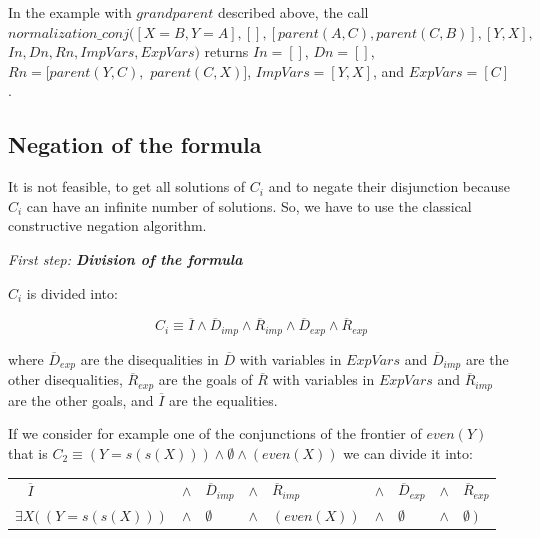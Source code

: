 \documentclass{tlp}
\begin{document}
\begin{itemize}
{In the example with $grandparent$ described above, the call \\
$normalization\_conj([X=B,Y=A], [], [parent(A,C),parent(C,B)], [Y,X],$ $ In, Dn,
Rn, ImpVars, ExpVars)$ 
returns $In=[]$, $Dn=[]$, $Rn=[parent(Y,C),$ $parent(C,X)]$, $ImpVars=[Y,X]$, and
$ExpVars=[C]$.
}
 \end{itemize}  
 


\subsection{Negation of the formula}
\label{negation}

It is not feasible, to get all solutions of $C_i$ and to negate their
disjunction because $C_i$ can have an infinite number of solutions. So,
we have to use the classical constructive negation algorithm.

\medskip

\noindent
{\em First step: {\bf Division of the formula}}

\noindent
$C_i$ is divided into: 

\[~C_i \equiv \overline{I} \wedge
        \overline{D}_{imp} \wedge \overline{R}_{imp} \wedge
        \overline{D}_{exp} \wedge \overline{R}_{exp} \]

\noindent
where $\overline{D}_{exp}$ are the disequalities in $\overline{D}$
with variables in $ExpVars$ and $\overline{D}_{imp}$ are the other
disequalities, $\overline{R}_{exp}$ are the goals of $\overline{R}$
with variables in $ExpVars$ and $\overline{R}_{imp}$ are the other
goals, and $\overline{I}$ are the equalities.

If we consider for example one of the conjunctions of the frontier of
$even(Y)$ that is $C_2 \equiv ( Y=s(s(X)) ) \wedge \emptyset \wedge ( even(X)
)$ we can divide it into:

\begin{center}
\begin{tabular}{lllllllll}
$~~~~\overline{I}$ & $\wedge$ & 
        $\overline{D}_{imp}$ & $\wedge$ & $\overline{R}_{imp}$ & $
        \wedge$ &
        $\overline{D}_{exp}$ & $ \wedge$ & $ \overline{R}_{exp}$ \\
$\exists X (~ ( Y=s(s(X)) )$ & 
       $\wedge$ & $\emptyset$ & $ \wedge$ & $ (even(X))$ & $  \wedge$
        & $ \emptyset$ & $ \wedge$ & $\emptyset~)$ \\
\end{tabular}
\end{center}
\end{document}
